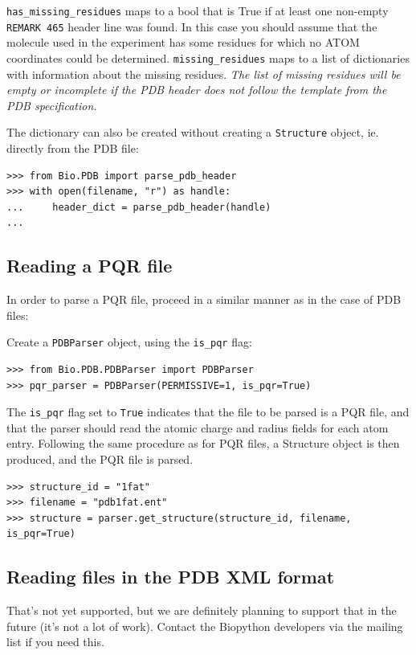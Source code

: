 \verb+has_missing_residues+ maps to a bool that is True if at least
one non-empty \verb+REMARK 465+ header line was found. In this case
you should assume that the molecule used in the experiment has some 
residues for which no ATOM coordinates could be determined. 
\verb+missing_residues+ maps to a list of dictionaries with information
about the missing residues. \emph{The list of missing residues will be
empty or incomplete if the PDB header does not follow the template from
the PDB specification.}

The dictionary can also be created without creating a \texttt{Structure}
object, ie. directly from the PDB file:

\begin{verbatim}
>>> from Bio.PDB import parse_pdb_header
>>> with open(filename, "r") as handle:
...     header_dict = parse_pdb_header(handle)
...
\end{verbatim}

\subsection{Reading a PQR file}

In order to parse a PQR file, proceed in a similar manner as in the case
of PDB files:

Create a \texttt{PDBParser} object, using the \texttt{is\_pqr} flag:

\begin{verbatim}
>>> from Bio.PDB.PDBParser import PDBParser
>>> pqr_parser = PDBParser(PERMISSIVE=1, is_pqr=True)
\end{verbatim}

The \texttt{is\_pqr} flag set to \texttt{True} indicates that the file to be parsed is a PQR file, 
and that the parser should read the atomic charge and radius fields for each atom entry. Following the same procedure as for PQR files, a Structure object is then produced, and the PQR file is parsed.

\begin{verbatim}
>>> structure_id = "1fat"
>>> filename = "pdb1fat.ent"
>>> structure = parser.get_structure(structure_id, filename, is_pqr=True)
\end{verbatim}

\subsection{Reading files in the PDB XML format}

That's not yet supported, but we are definitely planning to support that
in the future (it's not a lot of work). Contact the Biopython developers
via the mailing list if you need this.

